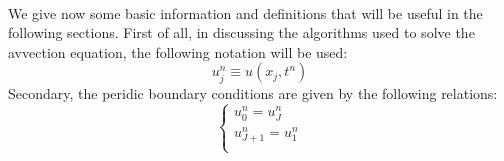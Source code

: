 \documentclass[11pt,a4paper]{article}
\begin{document}
\begin{figure}[!h]
\centering
{}
\end{figure}\ \\
We give now some basic information and definitions that will be useful in the following sections. First of all, in discussing the algorithms used to solve the avvection equation, the following notation will be used:
\begin{equation}
u_j^n \equiv u(x_j,t^n)
\end{equation}
Secondary, the peridic boundary conditions are given by the following relations:
\begin{equation}
\begin{cases}
u_0^n = u_J^n \\
u^n_{J+1}=u_1^n \\
\end{cases}
\end{equation}
\end{document}
